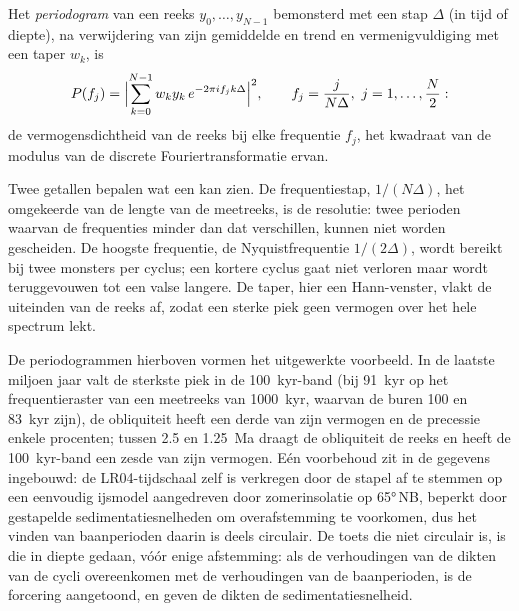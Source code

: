 \begin{definition}[Periodogram]\label{def:b3:sequence-stratigraphy:periodogram}
Het \emph{periodogram} van een reeks $y_0, \dots, y_{N-1}$
bemonsterd met een stap $\Delta$ (in tijd of diepte), na verwijdering van zijn gemiddelde
en trend en vermenigvuldiging met een taper $w_k$, is
\[
P(f_j) = \Bigl|\sum_{k=0}^{N-1} w_k y_k\, e^{-2\pi i f_j k\Delta}\Bigr|^2,
\qquad f_j = \frac{j}{N\Delta},\ j = 1, \dots, \frac N2:
\]
de vermogensdichtheid van de reeks bij elke frequentie $f_j$, het kwadraat van de modulus van
de discrete Fouriertransformatie ervan.
\end{definition}

Twee getallen bepalen wat een  kan zien. De frequentiestap, $1/(N\Delta)$,
het omgekeerde van de lengte van de meetreeks, is de resolutie: twee perioden waarvan de
frequenties minder dan dat verschillen, kunnen niet worden gescheiden. De hoogste frequentie, de
Nyquistfrequentie $1/(2\Delta)$, wordt bereikt bij twee monsters per cyclus; een
kortere cyclus gaat niet verloren maar wordt teruggevouwen tot een valse langere. De taper,
hier een Hann-venster, vlakt de uiteinden van de reeks af, zodat een sterke piek
geen vermogen over het hele spectrum lekt.


De periodogrammen hierboven vormen het uitgewerkte voorbeeld. In de laatste miljoen jaar valt de
sterkste piek in de \qty{100}{kyr}-band (bij \qty{91}{kyr} op het frequentieraster
van een meetreeks van \qty{1000}{kyr}, waarvan de buren 100 en \qty{83}{kyr} zijn),
de obliquiteit heeft een derde van zijn vermogen en de precessie enkele procenten;
tussen 2.5 en \qty{1.25}{Ma} draagt de obliquiteit de reeks en
heeft de \qty{100}{kyr}-band een zesde van zijn vermogen. Eén voorbehoud zit in de
gegevens ingebouwd: de LR04-tijdschaal zelf is verkregen door de stapel af te stemmen op een
eenvoudig ijsmodel aangedreven door zomerinsolatie op \ang{65}\,NB, beperkt door gestapelde
sedimentatiesnelheden om overafstemming te voorkomen, dus het vinden van baanperioden daarin is
deels circulair. De toets die niet circulair is, is die in diepte gedaan, vóór enige
afstemming: als de verhoudingen van de dikten van de cycli overeenkomen met de
verhoudingen van de baanperioden, is de forcering aangetoond, en geven de dikten de
sedimentatiesnelheid.

